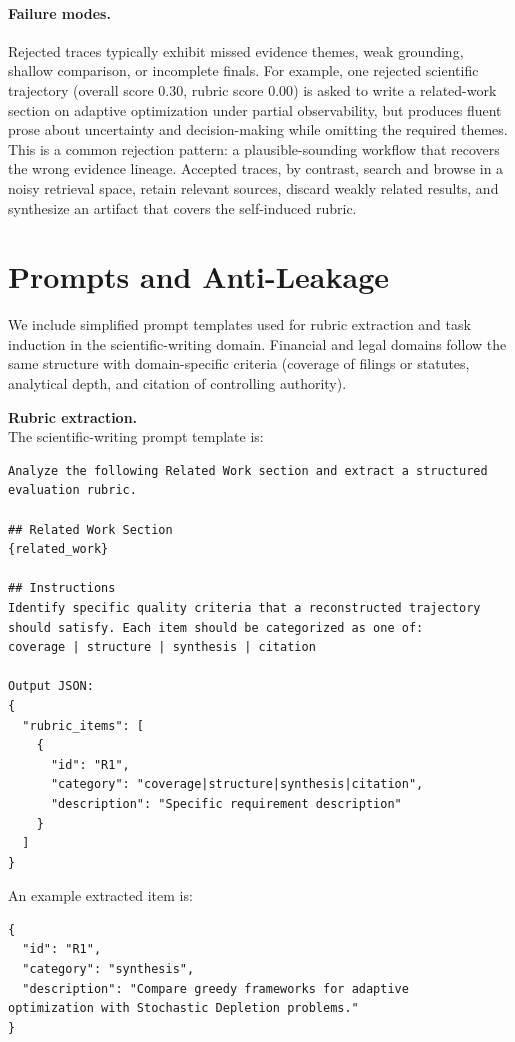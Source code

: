 

\paragraph{Failure modes.}
Rejected traces typically exhibit missed evidence themes, weak
grounding, shallow comparison, or incomplete finals. For example, one
rejected scientific trajectory (overall score $0.30$, rubric score
$0.00$) is asked to write a related-work section on adaptive
optimization under partial observability, but produces fluent prose
about uncertainty and decision-making while omitting the required
themes. This is a common rejection pattern: a plausible-sounding
workflow that recovers the wrong evidence lineage. Accepted traces, by
contrast, search and browse in a noisy retrieval space, retain relevant
sources, discard weakly related results, and synthesize an artifact that
covers the self-induced rubric.

\section{Prompts and Anti-Leakage}
\label{app:prompts}

We include simplified prompt templates used for rubric extraction and
task induction in the scientific-writing domain. Financial and legal
domains follow the same structure with domain-specific criteria
(coverage of filings or statutes, analytical depth, and citation of
controlling authority).

\vspace{2.5pt}
\noindent\textbf{Rubric extraction.}\\[0.6ex]
The scientific-writing prompt template is:
\vspace{0.55ex}
\begin{lstlisting}
Analyze the following Related Work section and extract a structured
evaluation rubric.

## Related Work Section
{related_work}

## Instructions
Identify specific quality criteria that a reconstructed trajectory
should satisfy. Each item should be categorized as one of:
coverage | structure | synthesis | citation

Output JSON:
{
  "rubric_items": [
    {
      "id": "R1",
      "category": "coverage|structure|synthesis|citation",
      "description": "Specific requirement description"
    }
  ]
}
\end{lstlisting}
An example extracted item is:
\begin{lstlisting}
{
  "id": "R1",
  "category": "synthesis",
  "description": "Compare greedy frameworks for adaptive
optimization with Stochastic Depletion problems."
}
\end{lstlisting}

